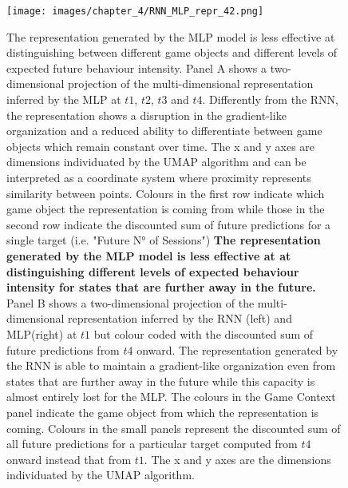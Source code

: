 \begin{figure}[ht]
\centering
\texttt{[image: images/chapter\_4/RNN\_MLP\_repr\_42.png]}
\caption[Lower dimensional representation of the latent states generated by the time-distributed MLP architecture]{The representation generated by the MLP model is less effective at distinguishing between different game objects and different levels of expected future behaviour intensity. Panel A shows a two-dimensional projection of the multi-dimensional representation inferred by the MLP at $t1$, $t2$, $t3$ and $t4$. Differently from the RNN, the representation shows a disruption in the gradient-like organization and a reduced ability to differentiate between game objects which remain constant over time. The x and y axes are dimensions individuated by the UMAP algorithm and can be interpreted as a coordinate system where proximity represents similarity between points. Colours in the first row indicate which game object the representation is coming from while those in the second row indicate the discounted sum of future predictions for a single target (i.e. "Future N° of Sessions") \textbf{The representation generated by the MLP model is less effective at at distinguishing different levels of expected behaviour intensity for states that are further away in the future.} Panel B shows a two-dimensional projection of the multi-dimensional representation inferred by the RNN (left) and MLP(right) at $t1$ but colour coded with the discounted sum of future predictions from $t4$ onward. The representation generated by the RNN is able to maintain a gradient-like organization even from states that are further away in the future while this capacity is almost entirely lost for the MLP. The colours in the Game Context panel indicate the game object from which the representation is coming. Colours in the small panels represent the discounted sum of all future predictions for a particular target computed from $t4$ onward instead that from $t1$. The x and y axes are the dimensions individuated by the UMAP algorithm.}
\label{predictive_panel}
\end{figure}


